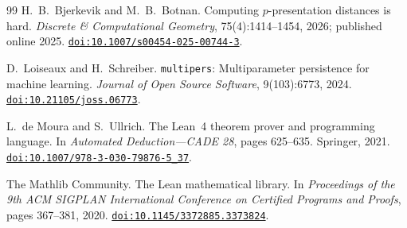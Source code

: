 \documentclass[11pt]{article}
\theoremstyle{definition}
\newcommand{\1}{\mathbf{1}}
\newcommand{\doi}[1]{\href{https://doi.org/#1}{\nolinkurl{doi:#1}}}
\begin{document}
\begin{thebibliography}{99}
H.~B.~Bjerkevik and M.~B.~Botnan.
\newblock Computing $p$-presentation distances is hard.
\newblock \emph{Discrete \& Computational Geometry}, 75(4):1414--1454,
2026; published online 2025.
\newblock \doi{10.1007/s00454-025-00744-3}.

D.~Loiseaux and H.~Schreiber.
\newblock \texttt{multipers}: Multiparameter persistence for machine
learning.
\newblock \emph{Journal of Open Source Software}, 9(103):6773, 2024.
\newblock \doi{10.21105/joss.06773}.

L.~de Moura and S.~Ullrich.
\newblock The Lean~4 theorem prover and programming language.
\newblock In \emph{Automated Deduction---CADE 28}, pages 625--635.
Springer, 2021.
\newblock \doi{10.1007/978-3-030-79876-5_37}.

The Mathlib Community.
\newblock The Lean mathematical library.
\newblock In \emph{Proceedings of the 9th ACM SIGPLAN International
Conference on Certified Programs and Proofs}, pages 367--381, 2020.
\newblock \doi{10.1145/3372885.3373824}.

\end{thebibliography}
\end{document}
